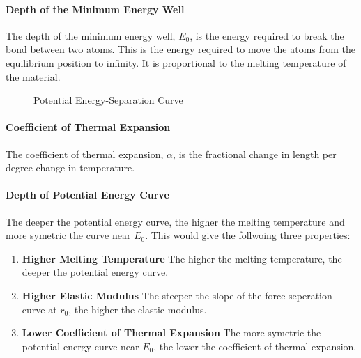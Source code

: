 \documentclass[11pt]{report}
\begin{document}
\paragraph{Depth of the Minimum Energy Well} The depth of the minimum energy well, $E_0$, is the energy required to break the bond between two atoms. This is the energy required to move the atoms from the equilibrium position to infinity. It is proportional to the melting temperature of the material.
\begin{figure}[h]
    \centering
    \caption{Potential Energy-Separation Curve}
    \label{fig:potential-energy}
\end{figure}
\paragraph{Coefficient of Thermal Expansion} The coefficient of thermal expansion, $\alpha$, is the fractional change in length per degree change in temperature. 
\paragraph{Depth of Potential Energy Curve} The deeper the potential energy curve, the higher the melting temperature and more symetric the curve near $E_0$. This would give the follwoing three properties:
\begin{enumerate}
    \item \textbf{Higher Melting Temperature} The higher the melting temperature, the deeper the potential energy curve.
    \item \textbf{Higher Elastic Modulus} The steeper the slope of the force-seperation curve at $r_0$, the higher the elastic modulus.
    \item \textbf{Lower Coefficient of Thermal Expansion} The more symetric the potential energy curve near $E_0$, the lower the coefficient of thermal expansion.
\end{enumerate}
\end{document}
